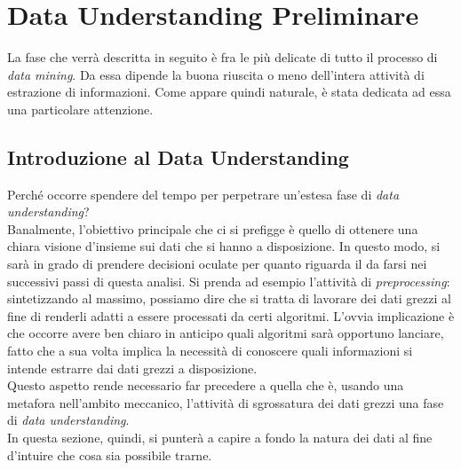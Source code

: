 
\chapter{Data Understanding Preliminare}
\label{ch:undst}

La fase che verrà descritta in seguito è fra le più delicate di tutto il processo di \textit{data mining}. Da essa dipende la buona riuscita o meno dell'intera attività di estrazione di informazioni. Come appare quindi naturale, è stata dedicata ad essa una particolare attenzione.

    \section{Introduzione al Data Understanding}

        Perché occorre spendere del tempo per perpetrare un'estesa fase di \textit{data understanding}? \\

        Banalmente, l'obiettivo principale che ci si prefigge è quello di ottenere una chiara visione d'insieme sui dati che si hanno a disposizione. In questo modo, si sarà in grado di prendere decisioni oculate per quanto riguarda il da farsi nei successivi passi di questa analisi. Si prenda ad esempio l'attività di \textit{preprocessing}: sintetizzando al massimo, possiamo dire che si tratta di lavorare dei dati grezzi al fine di renderli adatti a essere processati da certi algoritmi. L'ovvia implicazione è che occorre avere ben chiaro in anticipo quali algoritmi sarà opportuno lanciare, fatto che a sua volta implica la necessità di conoscere quali informazioni si intende estrarre dai dati grezzi a disposizione. \\

        Questo aspetto rende necessario far precedere a quella che è, usando una metafora nell'ambito meccanico, l'attività di sgrossatura dei dati grezzi una fase di \textit{data understanding}. \\

        In questa sezione, quindi, si punterà a capire a fondo la natura dei dati al fine d'intuire che cosa sia possibile trarne.

